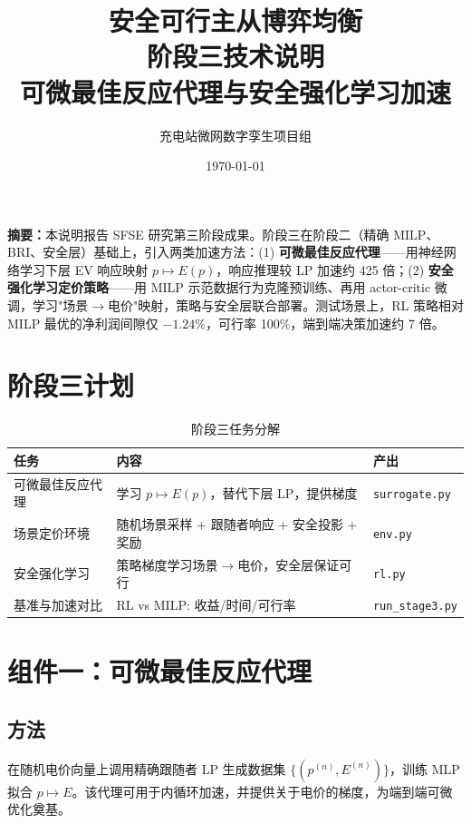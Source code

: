 \documentclass[UTF8,a4paper,11pt]{ctexart}
\title{\vspace{-1.4cm}\textbf{\color{mainblue}安全可行主从博弈均衡\\阶段三技术说明}\\[6pt]
\large 可微最佳反应代理与安全强化学习加速}
\author{充电站微网数字孪生项目组}
\date{\today}
\begin{document}
\sloppy
\maketitle
\thispagestyle{fancy}

\begin{center}
\begin{minipage}{0.93\textwidth}
\small
\textbf{摘要：}本说明报告 SFSE 研究第三阶段成果。阶段三在阶段二（精确 MILP、BRI、安全层）基础上，引入两类加速方法：(1) \textbf{可微最佳反应代理}——用神经网络学习下层 EV 响应映射 $p\mapsto E(p)$，响应推理较 LP 加速约 425 倍；(2) \textbf{安全强化学习定价策略}——用 MILP 示范数据行为克隆预训练、再用 actor-critic 微调，学习"场景$\to$电价"映射，策略与安全层联合部署。测试场景上，RL 策略相对 MILP 最优的净利润间隙仅 $-1.24\%$，可行率 100\%，端到端决策加速约 7 倍。
\end{minipage}
\end{center}

\vspace{0.4cm}

\section{阶段三计划}

\begin{table}[htbp]
\centering
\small
\caption{阶段三任务分解}
\begin{tabular}{p{2.6cm} p{6.2cm} p{4.6cm}}
\toprule
\textbf{任务} & \textbf{内容} & \textbf{产出}\\
\midrule
可微最佳反应代理 & 学习 $p\mapsto E(p)$，替代下层 LP，提供梯度 & \texttt{surrogate.py}\\
场景定价环境 & 随机场景采样 + 跟随者响应 + 安全投影 + 奖励 & \texttt{env.py}\\
安全强化学习 & 策略梯度学习场景$\to$电价，安全层保证可行 & \texttt{rl.py}\\
基准与加速对比 & RL vs MILP: 收益/时间/可行率 & \texttt{run\_stage3.py}\\
\bottomrule
\end{tabular}
\end{table}

\section{组件一：可微最佳反应代理}

\subsection{方法}
在随机电价向量上调用精确跟随者 LP 生成数据集 $\{(p^{(n)},E^{(n)})\}$，训练 MLP 拟合 $p\mapsto E$。该代理可用于内循环加速，并提供关于电价的梯度，为端到端可微优化奠基。
\end{document}
